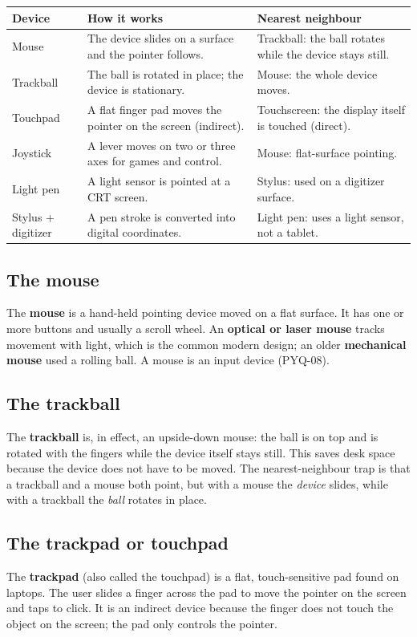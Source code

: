 \begin{center}
\begin{tabular}{p{}p{}p{}}
\toprule
\textbf{Device} & \textbf{How it works} & \textbf{Nearest neighbour} \\
\midrule
Mouse & The device slides on a surface and the pointer follows. & Trackball: the ball rotates while the device stays still. \\
Trackball & The ball is rotated in place; the device is stationary. & Mouse: the whole device moves. \\
Touchpad & A flat finger pad moves the pointer on the screen (indirect). & Touchscreen: the display itself is touched (direct). \\
Joystick & A lever moves on two or three axes for games and control. & Mouse: flat-surface pointing. \\
Light pen & A light sensor is pointed at a CRT screen. & Stylus: used on a digitizer surface. \\
Stylus + digitizer & A pen stroke is converted into digital coordinates. & Light pen: uses a light sensor, not a tablet. \\
\bottomrule
\end{tabular}
\end{center}

\subsection{The mouse}
The \textbf{mouse} is a hand-held pointing device moved on a flat surface. It
has one or more buttons and usually a scroll wheel. An \textbf{optical or
laser mouse} tracks movement with light, which is the common modern design;
an older \textbf{mechanical mouse} used a rolling ball. A mouse is an input
device (PYQ-08).

\subsection{The trackball}
The \textbf{trackball} is, in effect, an upside-down mouse: the ball is on
top and is rotated with the fingers while the device itself stays still. This
saves desk space because the device does not have to be moved. The
nearest-neighbour trap is that a trackball and a mouse both point, but with a
mouse the \emph{device} slides, while with a trackball the \emph{ball}
rotates in place.

\subsection{The trackpad or touchpad}
The \textbf{trackpad} (also called the touchpad) is a flat, touch-sensitive
pad found on laptops. The user slides a finger across the pad to move the
pointer on the screen and taps to click. It is an indirect device because the
finger does not touch the object on the screen; the pad only controls the
pointer.

